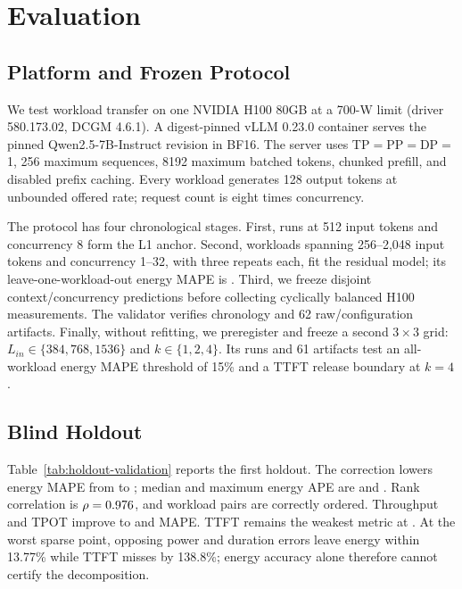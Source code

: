 \section{Evaluation}

\subsection{Platform and Frozen Protocol}

We test workload transfer on one NVIDIA H100 80GB at a 700-W limit (driver
580.173.02, DCGM 4.6.1).  A digest-pinned vLLM 0.23.0 container serves the
pinned Qwen2.5-7B-Instruct revision in BF16.  The server uses
TP$=$PP$=$DP$=$1, 256 maximum sequences, 8192 maximum batched tokens, chunked
prefill, and disabled prefix caching.  Every workload generates 128 output
tokens at unbounded offered rate; request count is eight times concurrency.

The protocol has four chronological stages.  First, \AnchorRepeats{} runs at
512 input tokens and concurrency 8 form the L1 anchor.  Second,
\DevelopmentWorkloads{} workloads spanning 256--2,048 input tokens and
concurrency 1--32, with three repeats each, fit the residual model; its
leave-one-workload-out energy MAPE is \DevelopmentLOOEnergyMAPE{}.  Third, we
freeze \HoldoutWorkloads{} disjoint context/concurrency predictions before
collecting \HoldoutMeasurements{} cyclically balanced H100 measurements.  The
validator verifies chronology and 62 raw/configuration artifacts.  Finally,
without refitting, we preregister and freeze a second $3\times3$ grid:
$L_{in}\in\{384,768,1536\}$ and $k\in\{1,2,4\}$.  Its
\ConfirmationMeasurements{} runs and 61 artifacts test an all-workload energy
MAPE threshold of 15\% and a TTFT release boundary at $k=4$.

\subsection{Blind Holdout}

Table~\ref{tab:holdout-validation} reports the first holdout.  The correction
lowers energy MAPE from \BaseEnergyMAPE{} to \CalibratedEnergyMAPE{}; median
and maximum energy APE are \EnergyMedianAPE{} and \EnergyMaxAPE{}.  Rank
correlation is $\rho=0.976{}$, and \EnergyPairwise{} workload pairs
are correctly ordered.  Throughput and TPOT improve to
\CalibratedThroughputMAPE{} and \CalibratedTPOTMAPE{} MAPE.  TTFT remains the
weakest metric at \CalibratedTTFTMAPE{}.  At the worst sparse point, opposing
power and duration errors leave energy within 13.77\% while TTFT misses by
138.8\%; energy accuracy alone therefore cannot certify the decomposition.

